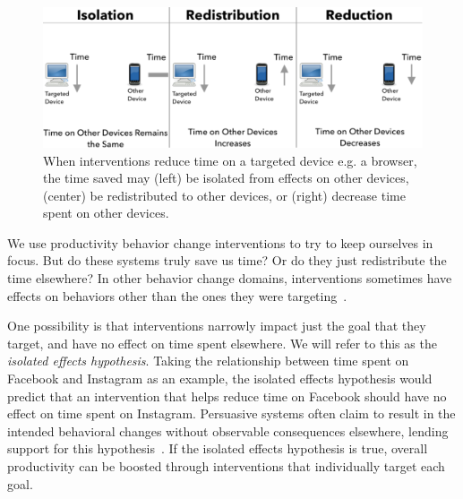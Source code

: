 \begin{figure}

\includegraphics[width=\linewidth]{figures2/intro/fig2v5.pdf}
\caption{When interventions reduce time on a targeted device e.g. a browser, the time saved may (left) be isolated from effects on other devices, (center) be redistributed to other devices, or (right) decrease time spent on other devices.} %
  \label{fig:hypotheses-across}
\end{figure}

We use productivity behavior change interventions to try to keep ourselves in focus. But do these systems truly save us time? Or do they just redistribute the time elsewhere? In other behavior change domains, interventions sometimes have effects on behaviors other than the ones they were targeting~\cite{stamford1986effects, COTTER2014243}. %

One possibility is that interventions narrowly impact just the goal that they target, and have no effect on time spent elsewhere. We will refer to this as the \textit{isolated effects hypothesis}. Taking the relationship between time spent on Facebook and Instagram as an example, the isolated effects hypothesis would predict that an intervention that helps reduce time on Facebook should have no effect on time spent on Instagram. Persuasive systems often claim to result in the intended behavioral changes without observable consequences elsewhere, lending support for this hypothesis~\cite{doi:10.1080/15228830802094429,cugelman2013gamification, lyons2014behavior,anderson2013steering, anderson2014engaging}. If the isolated effects hypothesis is true, overall productivity can be boosted through interventions that individually target each goal. %

